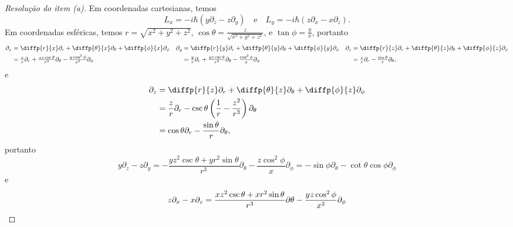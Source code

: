 \begin{proof}[Resolução do item (a)]
    Em coordenadas cartesianas, temos
    \begin{equation*}
        L_x =  -i \hbar \left(y \partial_{z} - z \partial_{y}\right)\quad\text{e}\quad L_y = -i \hbar \left(z\partial_{x} - x \partial_{z}\right).
    \end{equation*}
    Em coordenadas esféricas, temos \(r = \sqrt{x^2 + y^2 + z^2}\), \(\cos\theta = \frac{z}{\sqrt{x^2 + y^2 + z^2}}\), e \(\tan\phi = \frac{y}{x}\), portanto
    \begin{align*}
        \partial_{x} &=\textstyle \diffp{r}{x}\partial_r + \diffp{\theta}{x}\partial_\theta + \diffp{\phi}{x}\partial_\phi&
        \partial_{y} &=\textstyle \diffp{r}{y}\partial_r + \diffp{\theta}{y}\partial_\theta + \diffp{\phi}{y}\partial_\phi&
        \partial_{z} &=\textstyle \diffp{r}{z}\partial_r + \diffp{\theta}{z}\partial_\theta + \diffp{\phi}{z}\partial_\phi\\
                     &=\textstyle \frac{x}{r} \partial_r +  \frac{xz\csc\theta}{r^3} \partial_\theta -  \frac{y\cos^2\phi}{x^2} \partial_\phi&
                     &=\textstyle \frac{y}{r} \partial_r +  \frac{yz\csc\theta}{r^3} \partial_\theta -  \frac{\cos^2\phi}{x} \partial_\phi&
                       &=\textstyle \frac{z}{r}\partial_r - \frac{\sin\theta}{r} \partial_\theta,
    \end{align*}
    e
    \begin{align*}
        \partial_{z} &= \diffp{r}{z}\partial_r + \diffp{\theta}{z}\partial_\theta + \diffp{\phi}{z}\partial_\phi\\
                     &= \frac{z}{r} \partial_r - \csc\theta \left(\frac{1}{r} - \frac{z^2}{r^3}\right)\partial_\theta\\
                     &= \cos\theta \partial_r - \frac{\sin\theta}{r} \partial_\theta,
    \end{align*}
    portanto
    \begin{equation*}
        y \partial_z - z \partial_y = -\frac{yz^2 \csc\theta + y r^2\sin\theta}{r^3}\partial_\theta - \frac{z \cos^2\phi}{x}\partial_\phi
                                    = -\sin\phi\partial_\theta - \cot\theta \cos\phi \partial_\phi
    \end{equation*}
    e
    \begin{equation*}
        z \partial_x - x \partial_z = \frac{xz^2 \csc\theta + xr^2 \sin\theta}{r^3}\partial\theta - \frac{yz \cos^2\phi}{x^2}\partial_\phi\\

\end{equation*}
\end{proof}
